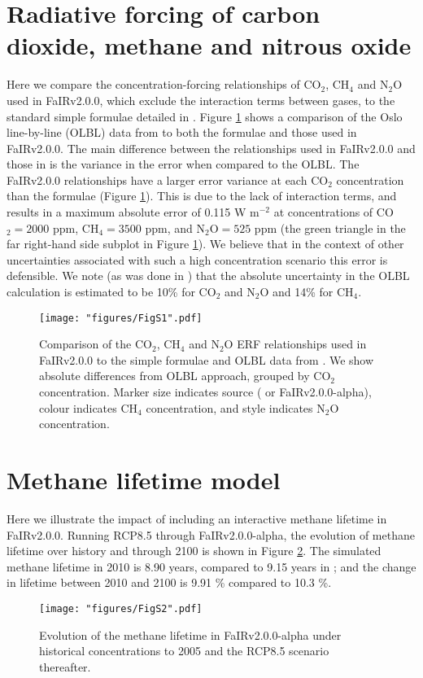 \documentclass[gmd, manuscript]{copernicus}
\begin{document}
\section{Radiative forcing of carbon dioxide, methane and nitrous oxide}
Here we compare the concentration-forcing relationships of CO$_2$, CH$_4$ and N$_2$O used in FaIRv2.0.0, which exclude the interaction terms between gases, to the standard simple formulae detailed in \cite{Etminan2016}. Figure \ref{fig:RF_etminan} shows a comparison of the Oslo line-by-line (OLBL) data from \citeauthor{Etminan2016} to both the \citeauthor{Etminan2016} formulae and those used in FaIRv2.0.0. The main difference between the relationships used in FaIRv2.0.0 and those in \citeauthor{Etminan2016} is the variance in the error when compared to the OLBL. The FaIRv2.0.0 relationships have a larger error variance at each CO$_2$ concentration than the \citeauthor{Etminan2016} formulae (Figure \ref{fig:RF_etminan}). This is due to the lack of interaction terms, and results in a maximum absolute error of 0.115 W m$^{-2}$ at concentrations of CO$_2=2000$ ppm, CH$_4=3500$ ppm, and N$_2$O$=525$ ppm (the green triangle in the far right-hand side subplot in Figure \ref{fig:RF_etminan}). We believe that in the context of other uncertainties associated with such a high concentration scenario this error is defensible. We note (as was done in \citeauthor{Etminan2016}) that the absolute uncertainty in the OLBL calculation is estimated to be 10\% for CO$_2$ and N$_2$O and 14\% for CH$_4$.\\
%
\begin{figure}[h]
    \texttt{[image: "figures/FigS1".pdf]}
    \caption{Comparison of the CO$_2$, CH$_4$ and N$_2$O ERF relationships used in FaIRv2.0.0 to the simple formulae and OLBL data from \citep{Etminan2016}. We show absolute differences from OLBL approach, grouped by CO$_2$ concentration. Marker size indicates source (\citeauthor{Etminan2016} or FaIRv2.0.0-alpha), colour indicates CH$_4$ concentration, and style indicates N$_2$O concentration.}
    \label{fig:RF_etminan}
\end{figure}
\clearpage
\section{Methane lifetime model}
Here we illustrate the impact of including an interactive methane lifetime in FaIRv2.0.0. Running RCP8.5 \citep{Riahi2011} through FaIRv2.0.0-alpha, the evolution of methane lifetime over history and through 2100 is shown in Figure \ref{fig:CH4_lifetime}. The simulated methane lifetime in 2010 is 8.90 years, compared to 9.15 years in \cite{Holmes2013}; and the change in lifetime between 2010 and 2100 is 9.91 \% compared to 10.3 \%.
%
\begin{figure}[h]
    \texttt{[image: "figures/FigS2".pdf]}
    \caption{Evolution of the methane lifetime in FaIRv2.0.0-alpha under historical concentrations \citep{Meinshausen2011c} to 2005 and the RCP8.5 scenario thereafter.}
    \label{fig:CH4_lifetime}
\end{figure}
\clearpage
%
\end{document}
